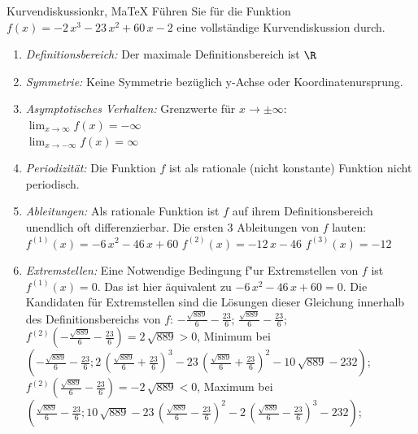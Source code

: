  \providecommand{\MoIl}{(} 
 \providecommand{\MoIr}{)}
 \providecommand{\MIntvlSep}{;} 
 \providecommand{\MElSetSep}{;} 
 \begin{MAufgabe}{Kurvendiskussion}{kr, MaTeX}
 F\"uhren Sie f\"ur die Funktion $f(x)= - 2\, x^3 - 23\, x^2 + 60\, x - 2$ eine vollst\"andige Kurvendiskussion durch.\\ 
 \ifLsg\Loesung
 \begin{enumerate}
 \item \emph{Definitionsbereich:} 
 Der maximale Definitionsbereich ist $\R$\item \emph{Symmetrie:} 
 Keine Symmetrie bez\"uglich y-Achse oder Koordinatenursprung.\item \emph{Asymptotisches Verhalten:} 
 Grenzwerte f\"ur $x\rightarrow \pm \infty$: \\ 
 $\lim_{x\rightarrow \infty} f(x)=- \infty$ \\ 
 $\lim_{x\rightarrow -\infty} f(x)=\infty$ \\ 
 \item \emph{Periodizit\"at:} 
 Die Funktion $f$ ist als rationale (nicht konstante) Funktion nicht periodisch.\item \emph{Ableitungen:} 
 Als rationale Funktion ist $f$ auf ihrem Definitionsbereich unendlich oft differenzierbar. 
 Die ersten 3 Ableitungen von $f$ lauten: \\ 
 $f^{(1)}(x)= - 6\, x^2 - 46\, x + 60$\newline 
  $f^{(2)}(x)= - 12\, x - 46$\newline 
  $f^{(3)}(x)=-12$\newline 
  \item \emph{Extremstellen:} 
 Eine Notwendige Bedingung f"ur Extremstellen von $f$ ist $f^{(1)}(x)=0$. 
 Das ist hier \"aquivalent zu $ - 6\, x^2 - 46\, x + 60=0$. 
 Die Kandidaten f\"ur Extremstellen sind die L\"osungen dieser Gleichung innerhalb des Definitionsbereichs von $f$: $ - \frac{\sqrt{889}}{6} - \frac{23}{6}$; $\frac{\sqrt{889}}{6} - \frac{23}{6}$; \\ 
 $f^{(2)}( - \frac{\sqrt{889}}{6} - \frac{23}{6})=2\, \sqrt{889}$$>0$, Minimum bei $( - \frac{\sqrt{889}}{6} - \frac{23}{6};2\, {\left(\frac{\sqrt{889}}{6} + \frac{23}{6}\right)}^3 - 23\, {\left(\frac{\sqrt{889}}{6} + \frac{23}{6}\right)}^2 - 10\, \sqrt{889} - 232)$; \\ 
 $f^{(2)}(\frac{\sqrt{889}}{6} - \frac{23}{6})=- 2\, \sqrt{889}$$<0$, Maximum bei $(\frac{\sqrt{889}}{6} - \frac{23}{6};10\, \sqrt{889} - 23\, {\left(\frac{\sqrt{889}}{6} - \frac{23}{6}\right)}^2 - 2\, {\left(\frac{\sqrt{889}}{6} - \frac{23}{6}\right)}^3 - 232)$; \\ 

\end{enumerate}
\end{MAufgabe}
